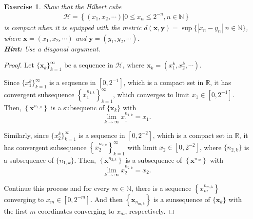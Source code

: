 \documentclass[11pt]{article}
\newtheorem{exercise}{Exercise}[section]
\theoremstyle{definition}
\numberwithin{equation}{subsection}
\begin{document}
\begin{exercise}\label{May_2017_3}
Show that the Hilbert cube
\begin{align*}
    \mathcal{H} = \left\{(x_1, x_2, \cdots) | 0 \leq x_n \leq 2^{-n}, n \in \mathbb{N} \right\}
\end{align*}
is compact when it is equipped with the metric $d(\mathbf{x}, \mathbf{y}) = \sup \{|x_n - y_n| | n \in \mathbb{N}\}$, where $\mathbf{x} = (x_1, x_2, \cdots)$ and $\mathbf{y} = (y_1, y_2, \cdots)$.\\
{\bf Hint:} Use a diagonal argument.
\end{exercise}
\begin{proof}
Let $\{\mathbf{x}_k\}^\infty_{k=1}$ be a sequence in $\mathcal{H}$, where $\mathbf{x}_k = \left(x^k_1, x^k_2, \cdots\right)$.

Since $\{x^k_1\}^\infty_{k=1}$ is a sequence in $\left[0, 2^{-1}\right]$, which is a compact set in $\mathbb{R}$, it has convergent subsequence $\left\{x^{n_{1,k}}_1\right\}^{\infty}_{k=1}$, which converges to limit $x_1 \in \left[0, 2^{-1}\right]$. Then, $\left\{\mathbf{x}^{n_{1,k}}\right\}$ is a subsequenc of $\{\mathbf{x}_k\}$ with 
$$\lim_{k \to \infty} x^{n_{1,k}}_1 = x_1.$$

Similarly, since $\{x^k_2\}^\infty_{k=1}$ is a sequence in $\left[0, 2^{-2}\right]$, which is a compact set in $\mathbb{R}$, it has convergent subsequence $\left\{x^{n_{2,k}}_2\right\}^{\infty}_{k=1}$ with limit $x_2 \in \left[0, 2^{-2}\right]$, where $\{n_{2,k}\}$ is a subsequence of $\{n_{1,k}\}$. Then, $\left\{\mathbf{x}^{n_{2,k}}\right\}$ is a subsequence of $\left\{\mathbf{x}^{n_{1k}}\right\}$ with 
$$\lim_{k \to \infty} x^{n_{2,k}}_2 = x_2.$$

Continue this process and for every $m \in \mathbb{N}$, there is a sequence $\left\{x^{n_{m,k}}_m \right\}$ converging to $x_m \in \left[0, 2^{-m}\right]$. And then $\left\{\mathbf{x}_{n_{m,k}} \right\}$ is a sunsequence of $\{\mathbf{x}_k\}$ with the first $m$ coordinates converging to $x_m$, respectively.


\end{proof}
\end{document}
